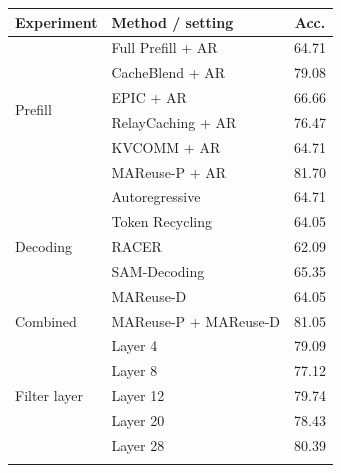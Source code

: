 \documentclass[letterpaper]{article} %
\newcommand{\thickhline}{\noalign{\hrule height 0.8pt}}
\begin{document}
\begin{center}
\centering
\small
\setlength{\tabcolsep}{10pt}
\begin{tabular}{llc}
\thickhline
\textbf{Experiment} & \textbf{Method / setting} & \textbf{Acc.} \\
\hline
\multirow{6}{*}{Prefill}
 & Full Prefill + AR & 64.71 \\
 & CacheBlend + AR & 79.08 \\
 & EPIC + AR & 66.66 \\
 & RelayCaching + AR & 76.47 \\
 & KVCOMM + AR & 64.71 \\
 & MAReuse-P + AR & 81.70 \\
\hline
\multirow{5}{*}{Decoding}
 & Autoregressive & 64.71 \\
 & Token Recycling & 64.05 \\
 & RACER & 62.09 \\
 & SAM-Decoding & 65.35 \\
 & MAReuse-D & 64.05 \\
\hline
Combined & MAReuse-P + MAReuse-D & 81.05 \\
\hline
\multirow{5}{*}{Filter layer}
 & Layer 4 & 79.09 \\
 & Layer 8 & 77.12 \\
 & Layer 12 & 79.74 \\
 & Layer 20 & 78.43 \\
 & Layer 28 & 80.39 \\
\thickhline
\end{tabular}
\label{tab:mmlu-2a-consolidated}
\end{center}
\end{document}
